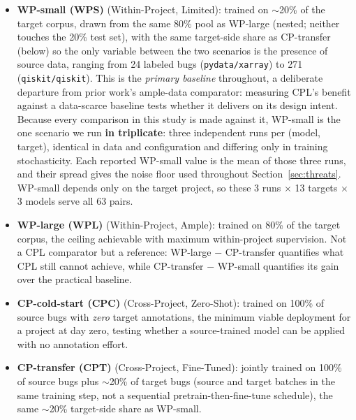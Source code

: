 \documentclass[a4paper,fleqn]{cas-dc}
\begin{document}
\begin{itemize}
  \item \textbf{WP-small (WPS)} (Within-Project, Limited): trained on
    $\sim$20\% of the target corpus, drawn from the same 80\% pool as
    WP-large (nested; neither touches the 20\% test set), with the same
    target-side share as CP-transfer (below) so the only variable between
    the two scenarios is the presence of source data, ranging from 24
    labeled bugs (\texttt{pydata/xarray}) to 271 (\texttt{qiskit/qiskit}).
    This is the \emph{primary baseline} throughout, a deliberate departure from prior work's
    ample-data comparator: measuring CPL's benefit against a data-scarce
    baseline tests whether it delivers on its design intent. Because every
    comparison in this study is made against it, WP-small is the one
    scenario we run \textbf{in triplicate}: three independent runs per
    (model, target), identical in data and configuration and differing
    only in training stochasticity. Each reported WP-small value is the
    mean of those three runs, and their spread gives the noise floor used
    throughout Section~\ref{sec:threats}. WP-small depends only on the
    target project, so these 3 runs $\times$ 13 targets $\times$ 3 models
    serve all 63 pairs.

  \item \textbf{WP-large (WPL)} (Within-Project, Ample): trained on 80\% of the
    target corpus, the ceiling achievable with maximum within-project
    supervision. Not a CPL comparator but a reference: WP-large $-$
    CP-transfer quantifies what CPL still cannot achieve, while
    CP-transfer $-$ WP-small quantifies its gain over the practical
    baseline.

  \item \textbf{CP-cold-start (CPC)} (Cross-Project, Zero-Shot): trained on 100\%
    of source bugs with \emph{zero} target annotations, the minimum
    viable deployment for a project at day zero, testing whether a
    source-trained model can be applied with no annotation effort.

  \item {} \textbf{CP-transfer (CPT)} (Cross-Project, Fine-Tuned):
    jointly trained on 100\% of source bugs plus $\sim$20\% of target bugs
    (source and target batches in the same training step, not a sequential
    pretrain-then-fine-tune schedule), the same $\sim$20\% target-side
    share as WP-small.
\end{itemize}
\end{document}
